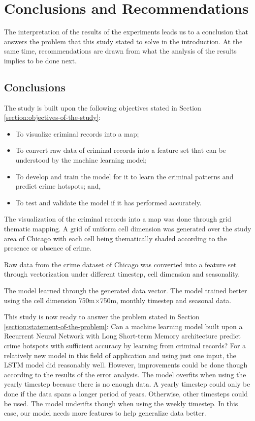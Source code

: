 \chapter{Conclusions and Recommendations}
    The interpretation of the results of the experiments leads us to a conclusion that answers the problem that this study stated to solve in the introduction. At the same time, recommendations are drawn from what the analysis of the results implies to be done next.

\section{Conclusions}
    The study is built upon the following objectives stated in Section \ref{section:objectives-of-the-study}:
    \begin{itemize}
        \item To visualize criminal records into a map;
        \item To convert raw data of criminal records into a feature set that can be understood by the machine learning model;
        \item To develop and train the model for it to learn the criminal patterns and predict crime hotspots; and,
        \item To test and validate the model if it has performed accurately.
    \end{itemize}

    The visualization of the criminal records into a map was done through grid thematic mapping. A grid of uniform cell dimension was generated over the study area of Chicago with each cell being thematically shaded according to the presence or absence of crime.

    Raw data from the crime dataset of Chicago was converted into a feature set through vectorization under different timestep, cell dimension and seasonality.

    The model learned through the generated data vector. The model trained better using the cell dimension 750m\(\times\)750m, monthly timestep and seasonal data.

    This study is now ready to answer the problem stated in Section \ref{section:statement-of-the-problem}: Can a machine learning model built upon a Recurrent Neural Network with Long Short-term Memory architecture predict crime hotspots with sufficient accuracy by learning from criminal records? For a relatively new model in this field of application and using just one input, the LSTM model did reasonably well. However, improvements could be done though according to the results of the error analysis. The model overfits when using the yearly timestep because there is no enough data. A yearly timestep could only be done if the data spans a longer period of years. Otherwise, other timesteps could be used. The model underifts though when using the weekly timestep. In this case, our model needs more features to help generalize data better.
